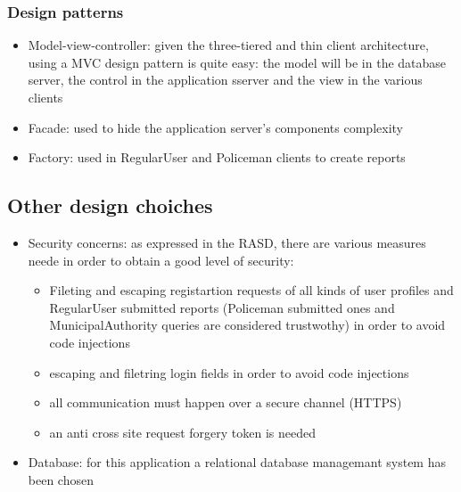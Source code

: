 \subsubsection{Design patterns}
\begin{itemize}
	\item Model-view-controller: given the three-tiered and thin client architecture, using a MVC design pattern is quite easy: the model will be in the database server, the control in the application sserver and the view in the various clients
	\item Facade: used to hide the application server's components complexity
	\item Factory: used in RegularUser and Policeman clients to create reports
\end{itemize}
\subsection{Other design choiches}
\begin{itemize}
	\item Security concerns: as expressed in the RASD, there are various measures neede in order to obtain a good level of security:
	\begin{itemize}
		\item Fileting and escaping registartion requests of all kinds of user profiles and RegularUser submitted reports (Policeman submitted ones and MunicipalAuthority queries are considered trustwothy) in order to avoid code injections
		\item escaping and filetring login fields in order to avoid code injections
		\item all communication must happen over a secure channel (HTTPS)
		\item an anti cross site request forgery token is needed 
	\end{itemize}
	\item Database: for this application a relational database managemant system has been chosen
\end{itemize}